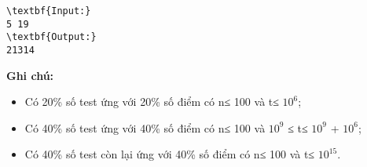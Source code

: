 \begin{verbatim}
\textbf{Input:}
5 19
\textbf{Output:}
21314
\end{verbatim}

\textbf{\textbf{Ghi chú:}}
\begin{itemize}
	\item Có 20\% số test ứng với 20\% số điểm có n≤ 100 và t≤ $10^{6}$;
	\item Có 40\% số test ứng với 40\% số điểm có n≤ 100 và $10^{9}$ ≤ t≤ $10^{9}$ + $10^{6}$;
	\item Có 40\% số test còn lại ứng với 40\% số điểm có n≤ 100 và t≤ $10^{15}$.
\end{itemize}